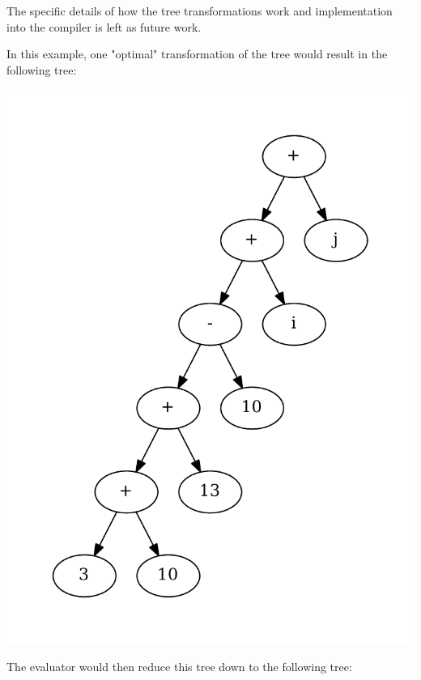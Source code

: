 The specific details of how the tree transformations work and implementation into the compiler is 
left as future work.

In this example, one "optimal" transformation of the tree would result in the following tree:

\begin{center}
\includegraphics[scale=0.5]{graphs/optimalEvalTree.pdf}
\end{center}

The evaluator would then reduce this tree down to the following tree:

